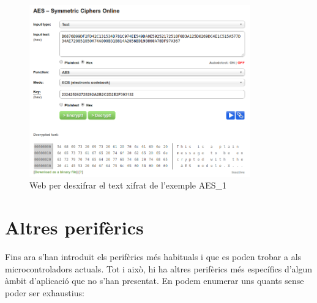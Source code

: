 \begin{figure}
 \centering
 \includegraphics[width=0.85\textwidth, keepaspectratio]{imatges/AESWebCheck.png}
 \caption{Web per desxifrar el text xifrat de l'exemple AES\_1}
 \label{fig:aes_web}
\end{figure}

\chapter{Altres perifèrics}
\label{ch:otherperipherals}
Fins ara s'han introduït els perifèrics més habituals i que es poden trobar a als microcontroladors actuals. Tot i això, hi ha altres perifèrics més específics d'algun àmbit d'aplicació que no s'han presentat. En podem enumerar uns quants sense poder ser exhaustius:

